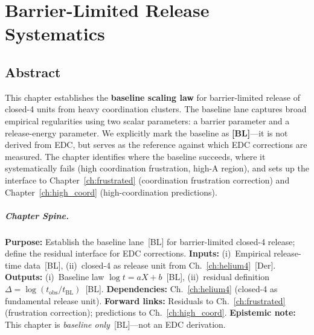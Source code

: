 
\chapter{Barrier-Limited Release Systematics}
\label{ch:barrier_release}


\section*{Abstract}

This chapter establishes the \textbf{baseline scaling law} for barrier-limited
release of closed-4 units from heavy coordination clusters. The baseline lane
captures broad empirical regularities using two scalar parameters: a barrier
parameter and a release-energy parameter. We explicitly mark the baseline as
\textbf{[BL]}---it is not derived from EDC, but serves as the reference against
which EDC corrections are measured. The chapter identifies where the baseline
succeeds, where it systematically fails (high coordination frustration,
high-A region), and sets up the interface to Chapter~\ref{ch:frustrated} (coordination
frustration correction) and Chapter~\ref{ch:high_coord} (high-coordination predictions).

\paragraph{Chapter Spine.}
\textbf{Purpose:} Establish the baseline lane~[BL] for barrier-limited closed-4
release; define the residual interface for EDC corrections.
\textbf{Inputs:} (i)~Empirical release-time data~[BL],
(ii)~closed-4 as release unit from Ch.~\ref{ch:helium4}~[Der].
\textbf{Outputs:} (i)~Baseline law $\log t = aX + b$~[BL],
(ii)~residual definition $\Delta = \log(t_{\text{obs}}/t_{\text{BL}})$~[BL].
\textbf{Dependencies:} Ch.~\ref{ch:helium4} (closed-4 as fundamental release unit).
\textbf{Forward links:} Residuals to Ch.~\ref{ch:frustrated} (frustration correction);
predictions to Ch.~\ref{ch:high_coord}.
\textbf{Epistemic note:} This chapter is \emph{baseline only}~[BL]---not an EDC derivation.

